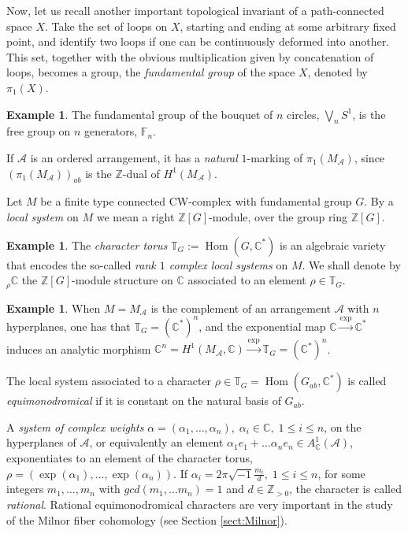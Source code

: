 \documentclass[psamsfonts]{conm-p-l}
\theoremstyle{definition}
\newtheorem{example}[theorem]{Example}
\theoremstyle{remark}
\numberwithin{equation}{section}
\newcommand{\A}{{\mathcal A}}
\newcommand{\Z}{\mathbb{Z}}
\newcommand{\C}{\mathbb{C}}
\newcommand{\F}{\mathbb{F}}
\newcommand{\TT}{\mathbb{T}}
\DeclareMathOperator{\Hom}{Hom}
\begin{document}
Now, let us recall another  important topological invariant of a path-connected space $X$. 
Take the set of loops on $X$, starting and ending at some arbitrary 
fixed point, and identify  two loops if one can be continuously deformed into another. This set,
together with the obvious multiplication given by concatenation of loops, becomes a group,
the {\it fundamental group} of the space $X$, denoted by $\pi_1(X)$.

\begin{example}
\label{wedgeS1}
The fundamental group of the bouquet of $n$ circles, $\bigvee_{n}S^1$, is 
the free group on $n$ generators, $\F_n$.
\end{example}

 If $\A$ is an ordered arrangement, it has a {\em natural} $1$-marking 
 of $\pi_1(M_{\A})$, since $(\pi_1(M_{\A}))_{ab}$ is the $\Z$-dual of
 $ H^1(M_{\A})$. 
 
 Let $M$ be a finite type connected CW-complex with fundamental group $G$. By a {\it local system} 
 on $M$ we mean a right $\Z[G]$-module, over the group ring $\Z[G]$.
 
\begin{example}
\label{rk1}
The {\em character torus} $\TT_{G}:=\Hom (G, \C^*)$ is an algebraic variety that encodes the
so-called {\em rank $1$ complex local systems} on $M$. 
We shall denote by $_{\rho}\C$ the $\Z[G]$-module structure on $\C$ associated to an element
$\rho \in \TT_{G}$. 
\end{example}

\begin{example}
\label{ex:exp}
When $M=M_{\A}$ is the complement of an arrangement $\A$ with $n$ hyperplanes, one has 
that $\TT_{G}=(\C^*)^n$, and the exponential map $\C \overset {\exp} \longrightarrow \C^*$ 
induces an analytic morphism 
$\C^n= H^1(M_{\A},\C) \overset {\exp} \longrightarrow  \TT_{G}=(\C^*)^n$.

The  local system associated to a character $\rho \in \TT_{G}=\Hom (G_{ab},\C^*)$ is called 
{\it equimonodromical} if it is constant on the natural basis of $G_{ab}$.

 A {\it system of complex weights} 
 $\alpha=(\alpha_1, \dots, \alpha_n), \; \alpha_i \in \C,\; 1 \leq i \leq n$, on the hyperplanes 
 of $\A$, or equivalently an element $\alpha_{1}e_1+ \dots \alpha_ne_n \in A^1_{\C}(\A)$, 
 exponentiates to an element of the character torus, $\rho=(\exp(\alpha_1), \dots, \exp(\alpha_n))$.
 If $\alpha_i=2 \pi \sqrt{-1}\frac{m_i}{d},\; 1 \leq i \leq n$, for some integers $m_1, \dots, m_n$ 
 with $gcd(m_1, \dots m_n)=1$ and $d \in \Z_{>0}$, the character is called {\em rational}.
 Rational equimonodromical characters are very important in the study of 
 the Milnor fiber cohomology (see Section \ref{sect:Milnor}).
\end{example}
\end{document}
